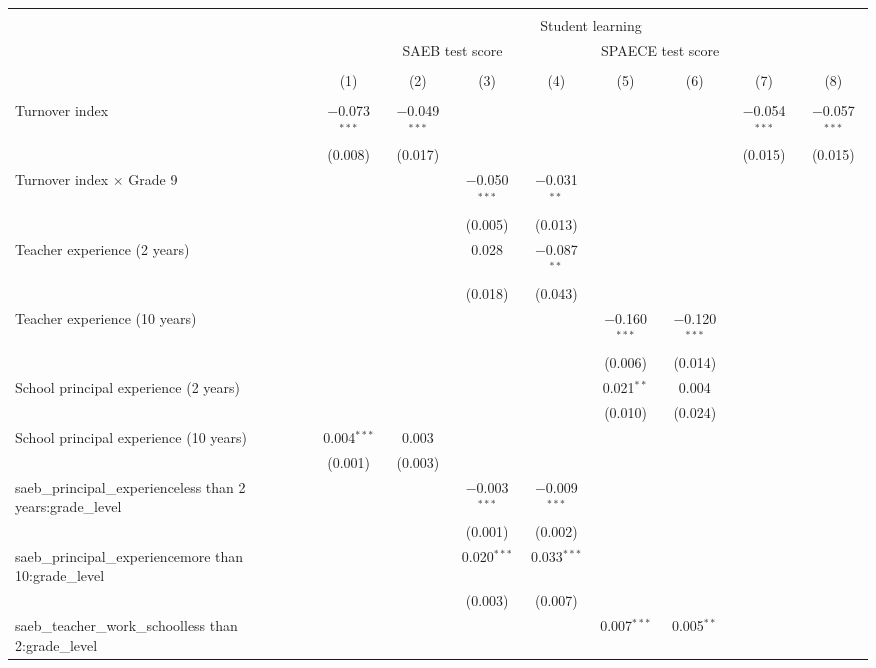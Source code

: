 
\begingroup 
\small 
\begin{tabular}{@{\extracolsep{5pt}}lcccccccc} 
\\[-1.8ex]\hline 
\hline \\[-1.8ex] 
 & \multicolumn{8}{c}{Student learning} \\ 
\cline{2-9} 
 & \multicolumn{4}{c}{SAEB test score} & \multicolumn{2}{c}{SPAECE test score} &  &  \\ 
\\[-1.8ex] & (1) & (2) & (3) & (4) & (5) & (6) & (7) & (8)\\ 
\hline \\[-1.8ex] 
 Turnover index & $-$0.073$^{***}$ & $-$0.049$^{***}$ &  &  &  &  & $-$0.054$^{***}$ & $-$0.057$^{***}$ \\ 
  & (0.008) & (0.017) &  &  &  &  & (0.015) & (0.015) \\ 
  Turnover index $\times$ Grade 9 &  &  & $-$0.050$^{***}$ & $-$0.031$^{**}$ &  &  &  &  \\ 
  &  &  & (0.005) & (0.013) &  &  &  &  \\ 
  Teacher experience (2 years) &  &  & 0.028 & $-$0.087$^{**}$ &  &  &  &  \\ 
  &  &  & (0.018) & (0.043) &  &  &  &  \\ 
  Teacher experience (10 years) &  &  &  &  & $-$0.160$^{***}$ & $-$0.120$^{***}$ &  &  \\ 
  &  &  &  &  & (0.006) & (0.014) &  &  \\ 
  School principal experience (2 years) &  &  &  &  & 0.021$^{**}$ & 0.004 &  &  \\ 
  &  &  &  &  & (0.010) & (0.024) &  &  \\ 
  School principal experience (10 years) & 0.004$^{***}$ & 0.003 &  &  &  &  &  &  \\ 
  & (0.001) & (0.003) &  &  &  &  &  &  \\ 
  saeb\_principal\_experienceless than 2 years:grade\_level &  &  & $-$0.003$^{***}$ & $-$0.009$^{***}$ &  &  &  &  \\ 
  &  &  & (0.001) & (0.002) &  &  &  &  \\ 
  saeb\_principal\_experiencemore than 10:grade\_level &  &  & 0.020$^{***}$ & 0.033$^{***}$ &  &  &  &  \\ 
  &  &  & (0.003) & (0.007) &  &  &  &  \\ 
  saeb\_teacher\_work\_schoolless than 2:grade\_level &  &  &  &  & 0.007$^{***}$ & 0.005$^{**}$ &  &  \\ 

\end{tabular}
